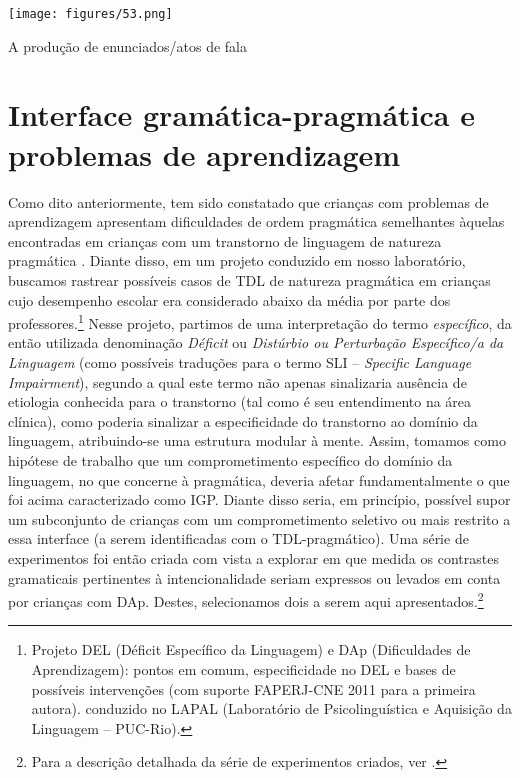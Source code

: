 \documentclass[output=paper,colorlinks,citecolor=brown,booklanguage=portuguese]{langscibook}
\begin{document}
\begin{Figura}
    \texttt{[image: figures/53.png]}
    \caption{{A produção de enunciados/atos de fala}}
    \label{fig:cap15fig1}
\end{Figura}


\section{Interface gramática-pragmática e problemas de aprendizagem}\label{sec:trêscap15}

Como dito anteriormente, tem sido constatado que crianças com problemas de aprendizagem apresentam dificuldades de ordem pragmática semelhantes àquelas encontradas em crianças com um transtorno de linguagem de natureza pragmática \citep{Bishop1989, Flanagan2005, Gerber1996, Norbury2002}. Diante disso, em um projeto conduzido em nosso laboratório, buscamos rastrear possíveis casos de TDL de natureza pragmática em crianças cujo desempenho escolar era considerado abaixo da média por parte dos professores.\footnote{Projeto DEL (Déficit Específico da Linguagem) e DAp (Dificuldades de Aprendizagem): pontos em comum, especificidade no DEL e bases de possíveis intervenções (com suporte FAPERJ-CNE 2011 para a primeira autora). conduzido no LAPAL (Laboratório de Psicolinguística e Aquisição da Linguagem – PUC-Rio).}  Nesse projeto, partimos de uma interpretação do termo \emph{específico}, da então utilizada denominação \emph{Déficit} ou \emph{Distúrbio ou Perturbação Específico/a da Linguagem} (como possíveis traduções para o termo SLI – \emph{Specific Language Impairment}), segundo a qual este termo não apenas sinalizaria ausência de etiologia conhecida para o transtorno (tal como é seu entendimento na área clínica), como poderia sinalizar a especificidade do transtorno ao domínio da linguagem, atribuindo-se uma estrutura modular à mente. Assim, tomamos como hipótese de trabalho que um comprometimento específico do domínio da linguagem, no que concerne à pragmática, deveria afetar fundamentalmente o que foi acima caracterizado como IGP. Diante disso seria, em princípio, possível supor um subconjunto de crianças com um comprometimento seletivo ou mais restrito a essa interface (a serem identificadas com o TDL-pragmático). Uma série de experimentos foi então criada com vista a explorar em que medida os contrastes gramaticais pertinentes à intencionalidade seriam expressos ou levados em conta por crianças com DAp. Destes, selecionamos dois a serem aqui apresentados.\footnote{Para a descrição detalhada da série de experimentos criados, ver \citep{Longchamps2014, Longchamps2011, Longchamps2013, Longchamps2014a}.}
\end{document}
